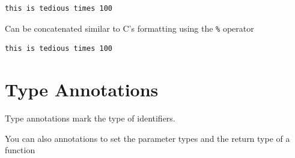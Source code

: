 \begin{verbatim}
this is tedious times 100
\end{verbatim}

Can be concatenated similar to C's formatting using the \texttt{\%}
operator

\begin{Shaded}
\begin{Highlighting}[]
\OperatorTok{=} 
\OperatorTok{=} 
\OperatorTok{=} 
\OperatorTok{=} 
\OperatorTok{=} 

\OperatorTok{=} \StringTok{ }\StringTok{ }\StringTok{ }\StringTok{ } \OperatorTok{\%}
\end{Highlighting}
\end{Shaded}

\begin{verbatim}
this is tedious times 100
\end{verbatim}

\section{Type
Annotations}\label{python-introduction.md__type-annotations}

Type annotations mark the type of identifiers.

\begin{Shaded}
\begin{Highlighting}[]
 \OperatorTok{=} 
 \OperatorTok{=} 
\end{Highlighting}
\end{Shaded}

You can also annotations to set the parameter types and the return type
of a function

\begin{Shaded}
\begin{Highlighting}[]
\NormalTok{) }\OperatorTok{{-}\textgreater{}} \NormalTok{:}
    \OperatorTok{*}
\end{Highlighting}
\end{Shaded}

